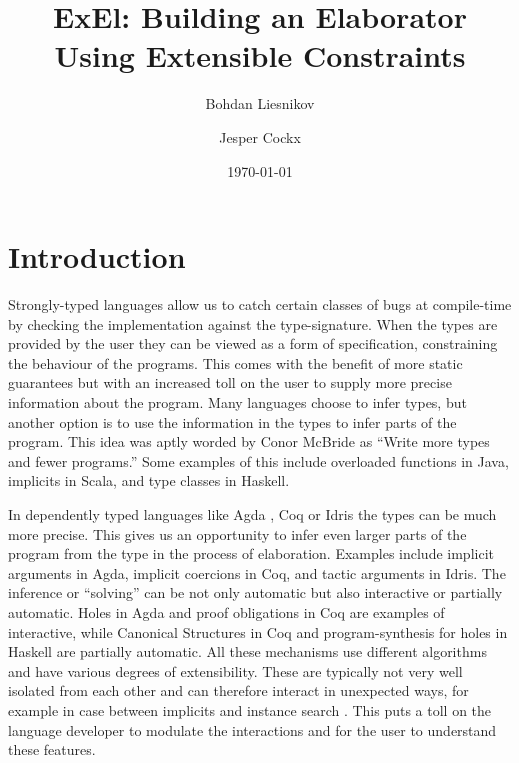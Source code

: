 \documentclass[
  sigconf,
  screen,
  review]{acmart}
\author{Bohdan Liesnikov}
\affiliation{
  \institution{Delft University of Technology}
  \city{Delft}
  \country{The Netherlands}}
\author{Jesper Cockx}
\affiliation{
  \institution{Delft University of Technology}
  \city{Delft}
  \country{The Netherlands}}
\title{ExEl: Building an Elaborator Using Extensible Constraints}
\author{}
\date{\today}
\begin{document}
\maketitle

\hypertarget{sec:introduction}{%
\section{Introduction}\label{sec:introduction}}

Strongly-typed languages allow us to catch certain classes of bugs at
compile-time by checking the implementation against the type-signature.
When the types are provided by the user they can be viewed as a form of
specification, constraining the behaviour of the programs. This comes
with the benefit of more static guarantees but with an increased toll on
the user to supply more precise information about the program. Many
languages choose to infer types, but another option is to use the
information in the types to infer parts of the program. This idea was
aptly worded by Conor McBride as ``Write more types and fewer
programs.''
\citep[chap.~2.1]{ptoopTypeInferenceThought2022, mcbrideEpigramPracticalProgramming2005}
Some examples of this include overloaded functions in Java, implicits in
Scala, and type classes in Haskell.

In dependently typed languages like Agda
\citep{norellPracticalProgrammingLanguage2007, theagdateamAgdaUserManual2023a},
Coq \citep{thecoqdevelopmentteamCoqProofAssistant2022} or Idris
\citep{bradyIdrisGeneralpurposeDependently2013} the types can be much
more precise. This gives us an opportunity to infer even larger parts of
the program from the type in the process of elaboration. Examples
include implicit arguments in Agda, implicit coercions in Coq, and
tactic arguments in Idris. The inference or ``solving'' can be not only
automatic but also interactive or partially automatic. Holes in Agda and
proof obligations in Coq are examples of interactive, while Canonical
Structures \citep{mahboubiCanonicalStructuresWorking2013} in Coq and
program-synthesis for holes in Haskell
\citep{koppelSearchingEntangledProgram2022} are partially automatic. All
these mechanisms use different algorithms and have various degrees of
extensibility. These are typically not very well isolated from each
other and can therefore interact in unexpected ways, for example in case
between implicits and instance search
\citep{agdausersPerformanceRegressionIssue2018}. This puts a toll on the
language developer to modulate the interactions and for the user to
understand these features.
\end{document}
